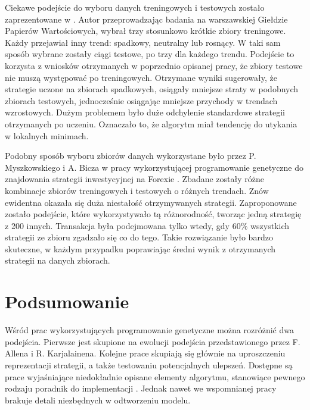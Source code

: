 \documentclass[twoside]{iisthesis}
\begin{document}
Ciekawe podejście do wyboru danych treningowych i testowych zostało zaprezentowane w \cite{GPW}. Autor przeprowadzając badania na warszawskiej Giełdzie Papierów Wartościowych, wybrał trzy stosunkowo krótkie zbiory treningowe. Każdy przejawiał inny trend: spadkowy, neutralny lub rosnący. W taki sam sposób wybrane zostały ciągi testowe, po trzy dla każdego trendu. Podejście to korzysta z wniosków otrzymanych w poprzednio opisanej pracy,  że zbiory testowe nie muszą występować po treningowych. Otrzymane wyniki sugerowały, że strategie uczone na zbiorach spadkowych, osiągały mniejsze straty w podobnych zbiorach testowych, jednocześnie osiągając mniejsze przychody w trendach wzrostowych. Dużym problemem było duże odchylenie standardowe strategii otrzymanych po uczeniu. Oznaczało to, że algorytm miał tendencję do utykania w lokalnych minimach.

Podobny sposób wyboru zbiorów danych wykorzystane było przez P. Myszkowskiego i A. Bicza w pracy wykorzystującej programowanie genetyczne do znajdowania strategii inwestycyjnej na Forexie \cite{Bicz}. Zbadane zostały różne kombinacje zbiorów treningowych i testowych o różnych trendach. Znów ewidentna okazała się duża niestałość otrzymywanych strategii. Zaproponowane zostało podejście, które wykorzystywało tą różnorodność, tworząc jedną strategię z 200 innych. Transakcja była podejmowana tylko wtedy, gdy 60\% wszystkich strategii ze zbioru zgadzało się co do tego. Takie rozwiązanie było bardzo skuteczne, w każdym przypadku poprawiając średni wynik z otrzymanych strategii na danych zbiorach.

\section{Podsumowanie}

Wśród prac wykorzystujących programowanie genetyczne można rozróżnić dwa podejścia. Pierwsze jest skupione na ewolucji podejścia przedstawionego przez  F. Allena i R. Karjalainena\cite{Allen1999245}. Kolejne prace skupiają się głównie na uproszczeniu reprezentacji strategii, a także testowaniu potencjalnych ulepszeń. Dostępne są prace wyjaśniające niedokładnie opisane elementy algorytmu, stanowiące pewnego rodzaju poradnik do implementacji \cite{5393324}. Jednak nawet we wspomnianej pracy brakuje detali niezbędnych w odtworzeniu modelu. 
\end{document}
